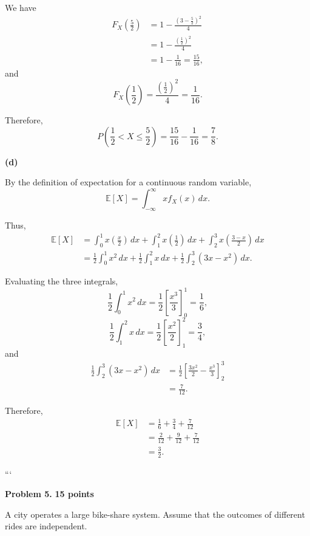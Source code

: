 \documentclass[11pt]{article}
\begin{document}
\begin{solutionbox}
We have
\begin{align*}
F_X\left(\frac52\right)
&=
1-\frac{\left(3-\frac52\right)^2}{4}\\
&=
1-\frac{\left(\frac12\right)^2}{4}\\
&=
1-\frac{1}{16}
=
\frac{15}{16},
\end{align*}
and
\[
F_X\left(\frac12\right)
=
\frac{\left(\frac12\right)^2}{4}
=
\frac{1}{16}.
\]

Therefore,
\[
P\left(\frac12<X\leq\frac52\right)
=
\frac{15}{16}-\frac{1}{16}
=
 {\frac78}.
\]

\textbf{(d)}

By the definition of expectation for a continuous random variable,
\[
\mathbb{E}[X]
=
\int_{-\infty}^{\infty}x f_X(x)\,dx.
\]

Thus,
\begin{align*}
\mathbb{E}[X]
&=
\int_0^1 x\left(\frac{x}{2}\right)\,dx
+
\int_1^2 x\left(\frac12\right)\,dx
+
\int_2^3 x\left(\frac{3-x}{2}\right)\,dx\\
&=
\frac12\int_0^1x^2\,dx
+
\frac12\int_1^2x\,dx
+
\frac12\int_2^3(3x-x^2)\,dx.
\end{align*}

Evaluating the three integrals,
\[
\frac12\int_0^1x^2\,dx
=
\frac12\left[\frac{x^3}{3}\right]_0^1
=
\frac16,
\]
\[
\frac12\int_1^2x\,dx
=
\frac12\left[\frac{x^2}{2}\right]_1^2
=
\frac34,
\]
and
\begin{align*}
\frac12\int_2^3(3x-x^2)\,dx
&=
\frac12
\left[
\frac{3x^2}{2}-\frac{x^3}{3}
\right]_2^3\\
&=
\frac{7}{12}.
\end{align*}

Therefore,
\begin{align*}
\mathbb{E}[X]
&=
\frac16+\frac34+\frac{7}{12}\\
&=
\frac{2}{12}+\frac{9}{12}+\frac{7}{12}\\
&=
 {\frac32}.
\end{align*}

\end{solutionbox}
```









 
\newpage
\begin{problemheader}
\textbf{Problem 5. } 
\hfill \textbf{15 points}
\end{problemheader}

A city operates a large bike-share system. Assume that the outcomes of
different rides are independent.
\end{document}
